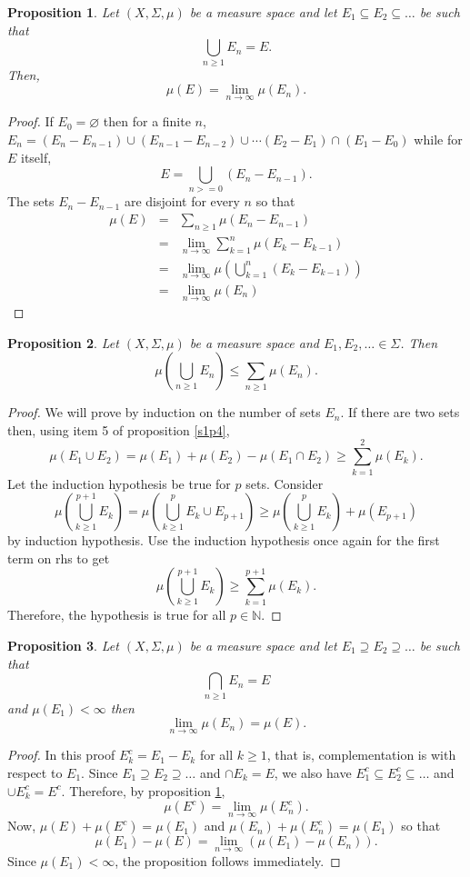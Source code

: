 \documentclass{article}
\theoremstyle{plain}
\numberwithin{thm}{section}
\theoremstyle{plain}
\newtheorem{prop}{Proposition}
\numberwithin{prop}{section}
\theoremstyle{definition}
\numberwithin{defn}{section}
\theoremstyle{remark}
\theoremstyle{plain}
\numberwithin{cor}{section}
\numberwithin{equation}{section}
\begin{document}
\begin{prop}\label{s1p5}Let $(X, \Sigma, \mu)$ be a measure space and let
$E_1 \subseteq E_2 \subseteq \ldots$ be such that
\[
\bigcup_{n \ge 1}E_n = E.
\]
Then,
\[
\mu(E) = \lim_{n \rightarrow \infty}\mu(E_n).
\]
\end{prop}
\begin{proof}
If $E_0 = \varnothing$ then for a finite $n$, $E_n = (E_n - E_{n-1}) \cup 
(E_{n-1} - E_{n-2}) \cup \cdots (E_2 - E_1) \cap (E_1 - E_0)$ while for $E$ 
itself,
\[
E = \bigcup_{n >= 0} (E_{n} - E_{n-1}).
\]
The sets $E_{n} - E_{n-1}$ are disjoint for every $n$ so that
\begin{eqnarray*}
\mu(E) &=& \sum_{n \ge 1} \mu(E_n - E_{n-1}) \\
  &=& \lim_{n \rightarrow \infty}\sum_{k=1}^n \mu(E_k - E_{k-1}) \\
  &=& \lim_{n \rightarrow \infty}\mu\left(\bigcup_{k=1}^n (E_k - E_{k-1})\right) \\
  &=& \lim_{n \rightarrow \infty}\mu(E_n)
\end{eqnarray*}
\end{proof}

\begin{prop}\label{s1p6}Let $(X, \Sigma, \mu)$ be a measure space and
$E_1, E_2, \ldots \in \Sigma$. Then
\[
\mu\left(\bigcup_{n \ge 1}E_n\right) \le \sum_{n \ge 1}\mu(E_n).
\]
\end{prop}
\begin{proof}
We will prove by induction on the number of sets $E_n$. If there are two sets
then, using item 5 of proposition \ref{s1p4},
\[
\mu(E_1 \cup E_2) = \mu(E_1) + \mu(E_2) - \mu(E_1 \cap E_2) \ge \sum_{k=1}^2\mu(E_k).
\]
Let the induction hypothesis be true for $p$ sets. Consider
\[
\mu\left(\bigcup_{k \ge 1}^{p+1}E_k\right) = 
\mu\left(\bigcup_{k \ge 1}^{p}E_k \cup E_{p+1}\right) \ge 
\mu\left(\bigcup_{k \ge 1}^{p}E_k\right) + \mu(E_{p+1})
\]
by induction hypothesis. Use the induction hypothesis once again for the first
term on rhs to get
\[
\mu\left(\bigcup_{k \ge 1}^{p+1}E_k\right) \ge \sum_{k=1}^{p+1}\mu(E_k).
\]
Therefore, the hypothesis is true for all $p \in \mathbb{N}$.
\end{proof}

\begin{prop}\label{s1p7}Let $(X, \Sigma, \mu)$ be a measure space and let
$E_1 \supseteq E_2 \supseteq \ldots$ be such that 
\[
\bigcap_{n \ge 1}E_n = E
\]
and $\mu(E_1) < \infty$ then
\[
\lim_{n \rightarrow \infty}\mu(E_n) = \mu(E).
\]
\end{prop}
\begin{proof}
In this proof $E_k^c = E_1 - E_k$ for all $k \ge 1$, that is, complementation is
with respect to $E_1$. Since $E_1 \supseteq E_2 \supseteq \ldots$ and $\cap E_k 
= E$, we also have $E_1^c \subseteq E_2^c \subseteq \ldots$ and $\cup E_k^c = E^c$.
Therefore, by proposition \ref{s1p5},
\[
\mu(E^c) = \lim_{n \rightarrow \infty}\mu(E_n^c).
\]
Now, $\mu(E) + \mu(E^c) = \mu(E_1)$ and $\mu(E_n) + \mu(E_n^c) = \mu(E_1)$ so that
\[
\mu(E_1) - \mu(E) = \lim_{n \rightarrow \infty}(\mu(E_1) - \mu(E_n)).
\]
Since $\mu(E_1) < \infty$, the proposition follows immediately.
\end{proof}
\end{document}
